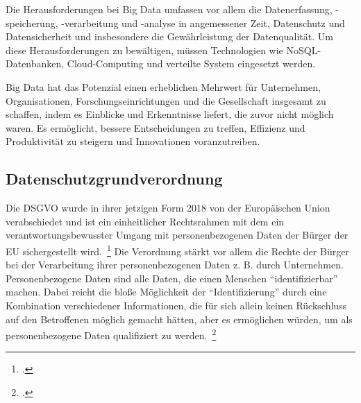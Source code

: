 Die Herausforderungen bei Big Data umfassen vor allem die Datenerfassung, -speicherung, -verarbeitung und -analyse in angemessener Zeit, Datenschutz und Datensicherheit und insbesondere die Gewährleistung der 
Datenqualität. Um diese Herausforderungen zu bewältigen, müssen Technologien wie NoSQL-Datenbanken, Cloud-Computing und verteilte System eingesetzt werden.

Big Data hat das Potenzial einen erheblichen Mehrwert für Unternehmen, Organisationen, Forschungseinrichtungen und die Gesellschaft insgesamt zu schaffen, indem es Einblicke und Erkenntnisse liefert, 
die zuvor nicht möglich waren. Es ermöglicht, bessere Entscheidungen zu treffen, Effizienz und Produktivität zu steigern und Innovationen voranzutreiben.

\subsection{Datenschutzgrundverordnung}

Die \ac{DSGVO} wurde in ihrer jetzigen Form 2018 von der Europäischen Union verabschiedet und ist ein einheitlicher Rechtsrahmen mit dem ein verantwortungsbewusster Umgang
mit personenbezogenen Daten der Bürger der \ac{EU} sichergestellt wird.~\footcite[\vglf][]{Voigt.2018}
Die Verordnung stärkt vor allem die Rechte der Bürger bei der Verarbeitung ihrer personenbezogenen Daten z. B. durch Unternehmen. Personenbezogene Daten sind alle Daten, die einen Menschen
\enquote{identifizierbar} machen. Dabei reicht die bloße Möglichkeit der \enquote{Identifizierung} durch eine Kombination verschiedener Informationen, 
die für sich allein keinen Rückschluss 
auf den Betroffenen möglich gemacht hätten, aber es ermöglichen würden, um als personenbezogene Daten qualifiziert zu werden.~\footcite[\vglf][]{Voigt.2018}

